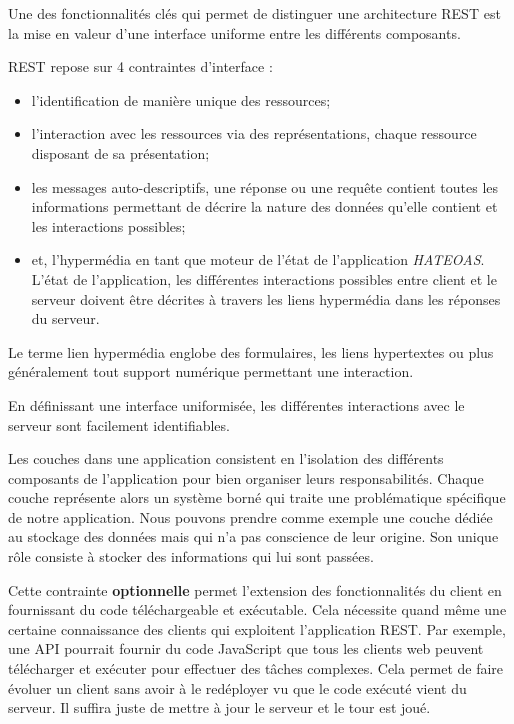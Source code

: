 \documentclass[big]{zmdocument}
\begin{document}


Une des fonctionnalités clés qui permet de distinguer une architecture REST est la mise en valeur d'une interface uniforme entre les différents composants.



REST repose sur 4 contraintes d'interface :



\begin{itemize}
\item l'identification de manière unique des ressources;
\item l'interaction avec les ressources via des représentations, chaque ressource disposant de sa présentation;
\item les messages auto-descriptifs, une réponse ou une requête contient toutes les informations permettant de décrire la nature des données qu'elle contient et les interactions possibles;
\item et, l'hypermédia en tant que moteur de l'état de l'application \textit{HATEOAS}. L'état de l'application, les différentes interactions possibles entre client et le serveur doivent être décrites à travers les liens hypermédia dans les réponses du serveur.
\end{itemize}


Le terme lien hypermédia englobe des formulaires, les liens hypertextes ou plus généralement tout support numérique permettant une interaction.



En définissant une interface uniformisée, les différentes interactions avec le serveur sont facilement identifiables.





Les couches dans une application consistent en l'isolation des différents composants de l'application pour bien organiser leurs responsabilités.
Chaque couche représente alors un système borné qui traite une problématique spécifique de notre application.
Nous pouvons prendre comme exemple une couche dédiée au stockage des données mais qui n'a pas conscience de leur origine. Son unique rôle consiste à stocker des informations qui lui sont passées.





Cette contrainte \textbf{optionnelle} permet l'extension des fonctionnalités du client en fournissant du code téléchargeable et exécutable.
Cela nécessite quand même une certaine connaissance des clients qui exploitent l'application REST.
Par exemple, une API pourrait fournir du code JavaScript que tous les clients web peuvent télécharger et exécuter pour effectuer des tâches complexes.
Cela permet de faire évoluer un client sans avoir à le redéployer vu que le code exécuté vient du serveur. Il suffira juste de mettre à jour le serveur et le tour est joué.
\end{document}
